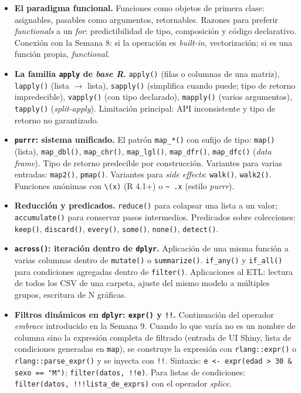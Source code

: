 \documentclass[11pt,letterpaper]{article}
\begin{document}
\begin{itemize}[leftmargin=*, itemsep=2pt]
    \item \textbf{El paradigma funcional.} Funciones como objetos de primera clase: asignables, pasables como argumentos, retornables. Razones para preferir \textit{functionals} a un \textit{for}: predictibilidad de tipo, composición y código declarativo. Conexión con la Semana 8: si la operación es \textit{built-in}, vectorización; si es una función propia, \textit{functional}.
    \item \textbf{La familia \texttt{apply} de \textit{base R}.} \texttt{apply()} (filas o columnas de una matriz), \texttt{lapply()} (lista $\to$ lista), \texttt{sapply()} (simplifica cuando puede; tipo de retorno impredecible), \texttt{vapply()} (con tipo declarado), \texttt{mapply()} (varios argumentos), \texttt{tapply()} (\textit{split-apply}). Limitación principal: API inconsistente y tipo de retorno no garantizado.
    \item \textbf{\texttt{purrr}: sistema unificado.} El patrón \texttt{map\_*()} con sufijo de tipo: \texttt{map()} (lista), \texttt{map\_dbl()}, \texttt{map\_chr()}, \texttt{map\_lgl()}, \texttt{map\_dfr()}, \texttt{map\_dfc()} (\textit{data frame}). Tipo de retorno predecible por construcción. Variantes para varias entradas: \texttt{map2()}, \texttt{pmap()}. Variantes para \textit{side effects}: \texttt{walk()}, \texttt{walk2()}. Funciones anónimas con \texttt{\textbackslash(x)} (R 4.1+) o \texttt{\textasciitilde{} .x} (estilo \textit{purrr}).
    \item \textbf{Reducción y predicados.} \texttt{reduce()} para colapsar una lista a un valor; \texttt{accumulate()} para conservar pasos intermedios. Predicados sobre colecciones: \texttt{keep()}, \texttt{discard()}, \texttt{every()}, \texttt{some()}, \texttt{none()}, \texttt{detect()}.
    \item \textbf{\texttt{across()}: iteración dentro de \texttt{dplyr}.} Aplicación de una misma función a varias columnas dentro de \texttt{mutate()} o \texttt{summarize()}. \texttt{if\_any()} y \texttt{if\_all()} para condiciones agregadas dentro de \texttt{filter()}. Aplicaciones al ETL: lectura de todos los CSV de una carpeta, ajuste del mismo modelo a múltiples grupos, escritura de N gráficas.
    \item \textbf{Filtros dinámicos en \texttt{dplyr}: \texttt{expr()} y \texttt{!!}.} Continuación del operador \textit{embrace} introducido en la Semana 9. Cuando lo que varía no es un nombre de columna sino la expresión completa de filtrado (entrada de UI Shiny, lista de condiciones generadas en \texttt{map}), se construye la expresión con \texttt{rlang::expr()} o \texttt{rlang::parse\_expr()} y se inyecta con \texttt{!!}. Sintaxis: \texttt{e <- expr(edad > 30 \& sexo == "M")}; \texttt{filter(datos, !!e)}. Para listas de condiciones: \texttt{filter(datos, !!!lista\_de\_exprs)} con el operador \textit{splice}.

\end{itemize}
\end{document}
